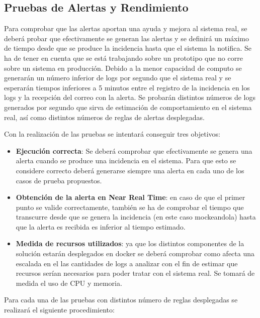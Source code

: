 \subsection{Pruebas de Alertas y Rendimiento}

Para comprobar que las alertas aportan una ayuda y mejora al sistema real, se deberá probar que efectivamente se generan las alertas y se definirá un máximo de tiempo desde que se produce la incidencia hasta que el sistema la notifica. Se ha de tener en cuenta que se está trabajando sobre un prototipo que no corre sobre un sistema en producción. Debido a la menor capacidad de computo se generarán un número inferior de logs por segundo que el sistema real y se esperarán tiempos inferiores a 5 minutos entre el registro de la incidencia en los logs y la recepción del correo con la alerta. Se probarán distintos números de logs generados por segundo que sirva de estimación de comportamiento en el sistema real, así como distintos números de reglas de alertas desplegadas.

Con la realización de las pruebas se intentará conseguir tres objetivos:

\begin{itemize}


	\item \textbf{Ejecución correcta}: Se deberá comprobar que efectivamente se genera una alerta cuando se produce una incidencia en el sistema. Para que esto se considere correcto deberá generarse siempre una alerta en cada uno de los casos de prueba propuestos.

	\item \textbf{Obtención de la alerta en Near Real Time}: en caso de que el primer punto se valide correctamente, también se ha de comprobar el tiempo que transcurre desde que se genera la incidencia (en este caso mockeandola) hasta que la alerta es recibida es inferior al tiempo estimado.

	\item \textbf{Medida de recursos utilizados}: ya que los distintos componentes de la solución estarán desplegados en docker se deberá comprobar como afecta una escalada en el las cantidades de logs a analizar con el fin de estimar que recursos serían necesarios para poder tratar con el sistema real. Se tomará de medida el uso de CPU y memoria.

\end{itemize}

Para cada una de las pruebas con distintos número de reglas desplegadas se realizará el siguiente procedimiento:

